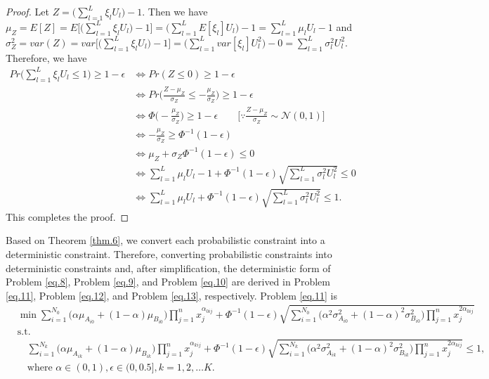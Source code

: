 \begin{proof}
	Let $Z=\bigg(\sum\limits_{l=1}^{L}\xi_lU_l\bigg)-1.$ Then we have 
	$\mu_Z=E[Z]=E\bigg[\bigg(\sum\limits_{l=1}^{L}\xi_lU_l\bigg)-1\bigg]=\bigg(\sum\limits_{l=1}^{L}E[\xi_l]U_l\bigg)-1=\sum\limits_{l=1}^{L}\mu_lU_l-1$ and $\sigma_Z^2=var(Z)=var\bigg[\bigg(\sum\limits_{l=1}^{L}\xi_lU_l\bigg)-1\bigg]=\bigg(\sum\limits_{l=1}^{L}var[\xi_l]U_l^2\bigg)-0=\sum\limits_{l=1}^{L}\sigma_l^2U_l^2.$ Therefore, we have 
	\begin{equation*}
		\begin{aligned}
		Pr\bigg(\sum\limits_{l=1}^{L}\xi_lU_l\le 1\bigg)\ge 1-\epsilon
		 & \Leftrightarrow Pr(Z\le 0)\ge 1-\epsilon\\
	    & \Leftrightarrow Pr\bigg(\frac{Z-\mu_Z}{\sigma_Z}\le -\frac{\mu_Z}{\sigma_Z}\bigg)\ge 1-\epsilon\\
	    & \Leftrightarrow \Phi\bigg(-\frac{\mu_Z}{\sigma_Z}\bigg)\ge 1-\epsilon \qquad \bigg[\because \frac{Z-\mu_Z}{\sigma_Z}\sim \mathcal{N}(0,1)\bigg]\\ 
	    & \Leftrightarrow -\frac{\mu_Z}{\sigma_Z}\ge \Phi^{-1}(1-\epsilon)\\
	    & \Leftrightarrow \mu_Z+\sigma_Z \Phi^{-1}(1-\epsilon)\le0\\
	    & \Leftrightarrow \sum\limits_{l=1}^{L}\mu_lU_l-1+\Phi^{-1}(1-\epsilon)\sqrt{\sum\limits_{l=1}^{L}\sigma_l^2U_l^2}\le0\\
	    & \Leftrightarrow \sum\limits_{l=1}^{L}\mu_lU_l+\Phi^{-1}(1-\epsilon)\sqrt{\sum\limits_{l=1}^{L}\sigma_l^2U_l^2}\le1.
		\end{aligned}
	\end{equation*}
This completes the proof.
\end{proof}
\par Based on Theorem \ref{thm.6}, we convert each probabilistic constraint into a deterministic constraint. Therefore, converting probabilistic constraints into deterministic constraints and, after simplification, the deterministic form of Problem \ref{eq.8}, Problem \ref{eq.9}, and Problem \ref{eq.10} are derived in Problem \ref{eq.11}, Problem \ref{eq.12}, and Problem \ref{eq.13}, respectively. Problem \ref{eq.11} is
\begin{equation}\label{eq.11}
	\begin{aligned}
		&	\min \sum\limits_{i=1}^{N_0}\big(\alpha\mu_{A_{i0}}+(1-\alpha)\mu_{B_{i0}}\big)\prod\limits_{j=1}^{n}x_j^{\alpha_{0ij}}+\Phi^{-1}(1-\epsilon)\sqrt{\sum\limits_{i=1}^{N_0}\big(\alpha^2\sigma_{A_{i0}}^2+(1-\alpha)^2\sigma_{B_{i0}}^2\big)\prod\limits_{j=1}^{n}x_j^{2\alpha_{0ij}}} \\
		&	\text{s.t.}\\
		& \quad \sum\limits_{i=1}^{N_k}\big(\alpha\mu_{A_{ik}}+(1-\alpha)\mu_{B_{ik}}\big)\prod\limits_{j=1}^{n}x_j^{\alpha_{kij}}+\Phi^{-1}(1-\epsilon)\sqrt{\sum\limits_{i=1}^{N_k}\big(\alpha^2\sigma_{A_{ik}}^2+(1-\alpha)^2\sigma_{B_{ik}}^2\big)\prod\limits_{j=1}^{n}x_j^{2\alpha_{kij}}}\leq 1,\\
		& \quad \text{where } \alpha \in (0,1), \epsilon \in(0,0.5], k=1,2,\ldots K.\\
	\end{aligned}
\end{equation}
